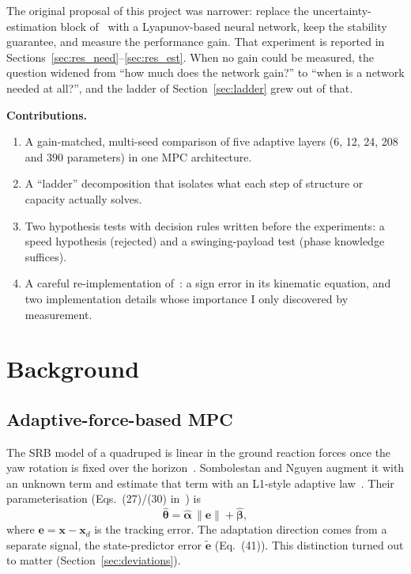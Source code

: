 \documentclass[conference]{IEEEtran}
\newcommand{\thetahat}{\hat{\bm\theta}}
\newcommand{\etilde}{\tilde{\bm e}}
\begin{document}
The original proposal of this project was narrower: replace the
uncertainty-estimation block of~\cite{sombolestan2024} with a
Lyapunov-based neural network, keep the stability guarantee, and measure
the performance gain. That experiment is reported in
Sections~\ref{sec:res_need}--\ref{sec:res_est}. When no gain could be
measured, the question widened from ``how much does the network gain?''
to ``when is a network needed at all?'', and the ladder of
Section~\ref{sec:ladder} grew out of that.

\textbf{Contributions.}
\begin{enumerate}
\item A gain-matched, multi-seed comparison of five adaptive layers
(6, 12, 24, 208 and 390 parameters) in one MPC architecture.
\item A ``ladder'' decomposition that isolates what each step of
structure or capacity actually solves.
\item Two hypothesis tests with decision rules written before the
experiments: a speed hypothesis (rejected) and a swinging-payload test
(phase knowledge suffices).
\item A careful re-implementation of~\cite{sombolestan2024}: a sign
error in its kinematic equation, and two implementation details whose
importance I only discovered by measurement.
\end{enumerate}

\section{Background}

\subsection{Adaptive-force-based MPC~\cite{sombolestan2024}}
The SRB model of a quadruped is linear in the ground reaction forces
once the yaw rotation is fixed over the horizon~\cite{dicarlo2018}.
Sombolestan and Nguyen augment it with an unknown term and estimate that
term with an L1-style adaptive law~\cite{hovakimyan2010}. Their
parameterisation (Eqs.~(27)/(30) in~\cite{sombolestan2024}) is
\begin{equation}
\thetahat = \hat{\bm\alpha}\,\|\bm e\| + \hat{\bm\beta},
\label{eq:m0}
\end{equation}
where $\bm e=\bm x-\bm x_d$ is the tracking error. The adaptation
direction comes from a separate signal, the state-predictor error
$\etilde$ (Eq.~(41)). This distinction turned out to matter
(Section~\ref{sec:deviations}).
\end{document}
